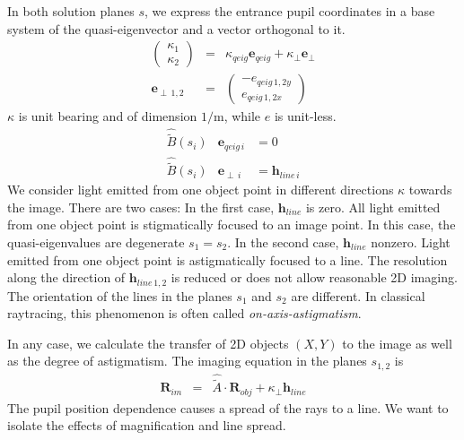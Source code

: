 \documentclass[12pt,a4paper,twoside,openright,BCOR10mm,headsepline,titlepage,abstracton,chapterprefix,final]{scrreprt}
\newcommand\Vector[1]{{\mathbf{#1}}}
\newcommand\meter{\textrm{m}}
\begin{document}
In both solution planes $s$, 
we express the entrance pupil coordinates in a base system of the quasi-eigenvector and a vector orthogonal to it.
\begin{eqnarray}
 \begin{pmatrix} \kappa_1 \\ \kappa_2 \end{pmatrix} &=& \kappa_{qeig} \Vector{e}_{qeig} + \kappa_\perp \Vector{e}_{\perp}
 \\
 \Vector{e}_{\perp\,1,2} &=&
 \begin{pmatrix}
  - e_{qeig\,1,2 y} \\ e_{qeig\,1,2 x}
 \end{pmatrix}
\end{eqnarray}
$\kappa$ is unit bearing and of dimension $1/\meter$, while $e$ is unit-less.
\begin{eqnarray}
 \hat{\tilde{B}}(s_i) & \Vector{e}_{qeig\, i} &= 0 \\
 \hat{\tilde{B}}(s_i) & \Vector{e}_{\perp\, i} &= \Vector{h}_{line\, i}
\end{eqnarray}
We consider light emitted from one object point 
in different directions $\kappa$ towards the image.
There are two cases:
In the first case, $\Vector{h}_{line}$ is zero. 
All light emitted from one object point is stigmatically focused to an image point.
In this case, the quasi-eigenvalues are degenerate $s_1 = s_2$.
In the second case, $\Vector{h}_{line}$ nonzero.
Light emitted from one object point is astigmatically focused to a line.
The resolution along the direction of $\Vector{h}_{line\,1,2}$ is reduced or does not allow
reasonable 2D imaging.
The orientation of the lines in the planes $s_1$ and $s_2$ are different.
In classical raytracing, this phenomenon is often called \emph{on-axis-astigmatism}.

In any case, we calculate the transfer of 2D objects $(X,Y)$ to the image as well as the degree of astigmatism.
The imaging equation in the planes $s_{1,2}$ is
\begin{eqnarray}
 \Vector{R}_{im} &=& \hat{\tilde{A}} \cdot \Vector{R}_{obj}
                  +  \kappa_\perp \Vector{h}_{line}
\end{eqnarray}
The pupil position dependence causes a spread of the rays to a line.
We want to isolate the effects of magnification and line spread.
\end{document}
